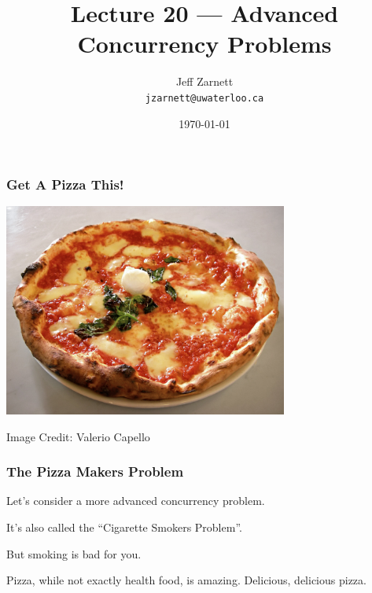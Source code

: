 

\title{Lecture 20 --- Advanced Concurrency Problems }

\author{Jeff Zarnett \\ \small \texttt{jzarnett@uwaterloo.ca}}
\date{\today}




\begin{frame}
	\titlepage

\end{frame}


\begin{frame}
	\frametitle{Get A Pizza This!}
	\begin{center}
		\includegraphics[width=0.7\textwidth]{images/pizza.jpg}
	\end{center}
	\hfill Image Credit: Valerio Capello

\end{frame}

\begin{frame}
	\frametitle{The Pizza Makers Problem}

	Let's consider a more advanced concurrency problem.

	It's also called the ``Cigarette Smokers Problem''.

	But smoking is bad for you.

	Pizza, while not exactly health food, is amazing. Delicious, delicious pizza.


\end{frame}


